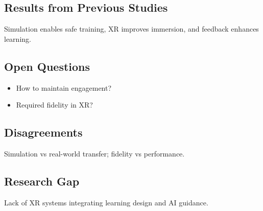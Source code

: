 \subsection{Results from Previous Studies}
Simulation enables safe training, XR improves immersion, and feedback enhances learning.

\subsection{Open Questions}
\begin{itemize}
    \item How to maintain engagement?
    \item Required fidelity in XR?
\end{itemize}

\subsection{Disagreements}
Simulation vs real-world transfer; fidelity vs performance.

\subsection{Research Gap}
Lack of XR systems integrating learning design and AI guidance.

